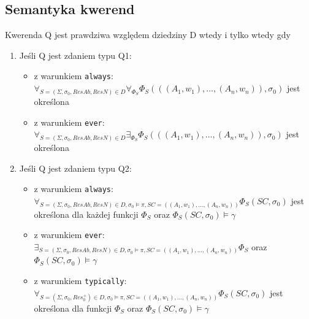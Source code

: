 \documentclass{article}
\begin{document}
\subsection{Semantyka kwerend}
Kwerenda Q jest prawdziwa względem dziedziny D wtedy i tylko wtedy gdy
\begin{enumerate}
	\item Jeśli Q jest zdaniem typu Q1:
	\begin{itemize}
		\item z warunkiem \texttt{always}: $\forall_{S=(\Sigma, \sigma_{0}, ResAb, ResN) \in D}\forall_{\Phi_{S}} \Phi_{S}(((A_{1}, w_{1}), \dots, (A_{n}, w_{n})), \sigma_{0})$ jest określona
		\item z warunkiem \texttt{ever}: 
		$\forall_{S=(\Sigma, \sigma_{0}, ResAb, ResN) \in D}\exists_{\Phi_{S}} \Phi_{S}(((A_{1}, w_{1}), \dots, (A_{n}, w_{n})), \sigma_{0})$ jest określona
	\end{itemize}
	\item Jeśli Q jest zdaniem typu Q2:
	\begin{itemize}
		\item z warunkiem \texttt{always}: 
		$\forall_{S=(\Sigma, \sigma_{0}, ResAb, ResN) \in D, \sigma_{0} \models \pi, SC=((A_{1}, w_{1}), \dots, (A_{n}, w_{n}))} \Phi_{S}(SC, \sigma_{0})$ jest określona dla każdej funkcji $\Phi_{S}$ oraz $\Phi_{S}(SC, \sigma_{0}) \models \gamma$
		\item z warunkiem \texttt{ever}:
		$\exists_{S=(\Sigma, \sigma_{0}, ResAb, ResN) \in D, \sigma_{0} \models \pi, SC=((A_{1}, w_{1}), \dots, (A_{n}, w_{n}))} \Phi_{S}$ oraz $\Phi_{S}(SC, \sigma_{0}) \models \gamma$
		\item z warunkiem \texttt{typically}:
		$\forall_{S=(\Sigma, \sigma_{0}, Res_{0}^{+}) \in D, \sigma_{0} \models \pi, SC=((A_{1}, w_{1}), \dots, (A_{n}, w_{n}))} \Phi_{S}(SC, \sigma_{0})$ jest określona dla funkcji $\Phi_{S}$ oraz $\Phi_{S}(SC, \sigma_{0}) \models \gamma$
	\end{itemize}
	

\end{enumerate}
\end{document}
